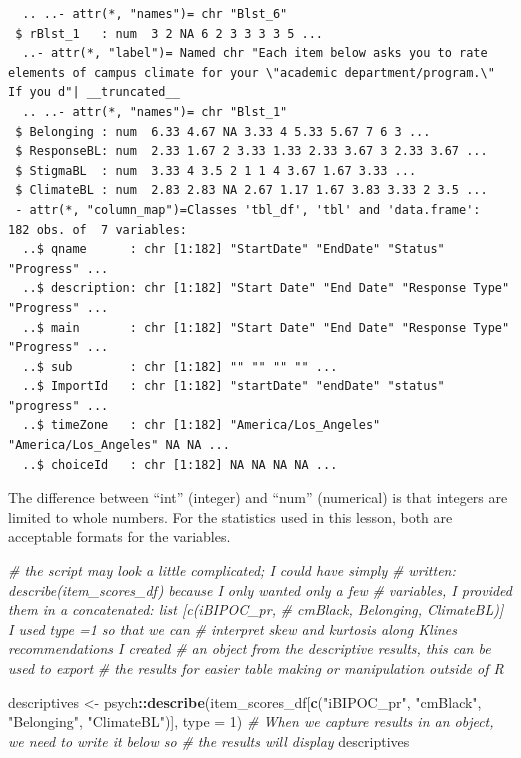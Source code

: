 \documentclass[
  11pt,
]{book}
\newenvironment{Shaded}{\begin{snugshade}}{\end{snugshade}}
\newcommand{\AttributeTok}[1]{\textcolor[rgb]{0.27,0.27,0.27}{#1}}
\newcommand{\CommentTok}[1]{\textcolor[rgb]{0.37,0.37,0.37}{\textit{#1}}}
\newcommand{\DecValTok}[1]{\textcolor[rgb]{0.06,0.06,0.06}{#1}}
\newcommand{\FunctionTok}[1]{\textcolor[rgb]{0.27,0.27,0.27}{\textbf{#1}}}
\newcommand{\NormalTok}[1]{#1}
\newcommand{\OtherTok}[1]{\textcolor[rgb]{0.37,0.37,0.37}{#1}}
\newcommand{\SpecialCharTok}[1]{\textcolor[rgb]{0.43,0.43,0.43}{\textbf{#1}}}
\newcommand{\StringTok}[1]{\textcolor[rgb]{0.5,0.5,0.5}{#1}}
\begin{document}
\begin{verbatim}
  .. ..- attr(*, "names")= chr "Blst_6"
 $ rBlst_1   : num  3 2 NA 6 2 3 3 3 3 5 ...
  ..- attr(*, "label")= Named chr "Each item below asks you to rate elements of campus climate for your \"academic department/program.\"  If you d"| __truncated__
  .. ..- attr(*, "names")= chr "Blst_1"
 $ Belonging : num  6.33 4.67 NA 3.33 4 5.33 5.67 7 6 3 ...
 $ ResponseBL: num  2.33 1.67 2 3.33 1.33 2.33 3.67 3 2.33 3.67 ...
 $ StigmaBL  : num  3.33 4 3.5 2 1 1 4 3.67 1.67 3.33 ...
 $ ClimateBL : num  2.83 2.83 NA 2.67 1.17 1.67 3.83 3.33 2 3.5 ...
 - attr(*, "column_map")=Classes 'tbl_df', 'tbl' and 'data.frame':  182 obs. of  7 variables:
  ..$ qname      : chr [1:182] "StartDate" "EndDate" "Status" "Progress" ...
  ..$ description: chr [1:182] "Start Date" "End Date" "Response Type" "Progress" ...
  ..$ main       : chr [1:182] "Start Date" "End Date" "Response Type" "Progress" ...
  ..$ sub        : chr [1:182] "" "" "" "" ...
  ..$ ImportId   : chr [1:182] "startDate" "endDate" "status" "progress" ...
  ..$ timeZone   : chr [1:182] "America/Los_Angeles" "America/Los_Angeles" NA NA ...
  ..$ choiceId   : chr [1:182] NA NA NA NA ...
\end{verbatim}

The difference between ``int'' (integer) and ``num'' (numerical) is that integers are limited to whole numbers. For the statistics used in this lesson, both are acceptable formats for the variables.

\begin{Shaded}
\begin{Highlighting}[]
\CommentTok{\# the script may look a little complicated; I could have simply}
\CommentTok{\# written: describe(item\_scores\_df) because I only wanted only a few}
\CommentTok{\# variables, I provided them in a concatenated: list [c(\textquotesingle{}iBIPOC\_pr\textquotesingle{},}
\CommentTok{\# \textquotesingle{}cmBlack\textquotesingle{}, \textquotesingle{}Belonging\textquotesingle{}, \textquotesingle{}ClimateBL\textquotesingle{})] I used type =1 so that we can}
\CommentTok{\# interpret skew and kurtosis along Kline\textquotesingle{}s recommendations I created}
\CommentTok{\# an object from the descriptive results, this can be used to export}
\CommentTok{\# the results for easier table making or manipulation outside of R}

\NormalTok{descriptives }\OtherTok{\textless{}{-}}\NormalTok{ psych}\SpecialCharTok{::}\FunctionTok{describe}\NormalTok{(item\_scores\_df[}\FunctionTok{c}\NormalTok{(}\StringTok{"iBIPOC\_pr"}\NormalTok{, }\StringTok{"cmBlack"}\NormalTok{,}
    \StringTok{"Belonging"}\NormalTok{, }\StringTok{"ClimateBL"}\NormalTok{)], }\AttributeTok{type =} \DecValTok{1}\NormalTok{)}
\CommentTok{\# When we capture results in an object, we need to write it below so}
\CommentTok{\# the results will display}
\NormalTok{descriptives}
\end{Highlighting}
\end{Shaded}
\end{document}

